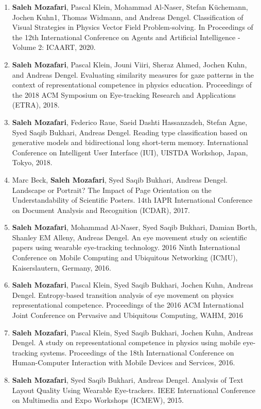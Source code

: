 \begin{enumerate}
	\item \textbf{Saleh Mozafari}, Pascal Klein, Mohammad Al-Naser, Stefan Küchemann, Jochen Kuhn1, Thomas Widmann, and Andreas Dengel. Classification of Visual Strategies in Physics Vector Field Problem-solving. In Proceedings of the 12th International Conference on Agents and Artificial Intelligence - Volume 2: ICAART, 2020.
	\item \textbf{Saleh Mozafari}, Pascal Klein, Jouni Viiri, Sheraz Ahmed, Jochen Kuhn, and Andreas Dengel.  Evaluating similarity measures for gaze patterns in the context of representational competence in physics education. Proceedings of the 2018 ACM Symposium on Eye-tracking Research and Applications (ETRA), 2018.
	\item \textbf{Saleh Mozafari}, Federico Raue, Saeid Dashti Hassanzadeh, Stefan Agne, Syed Saqib Bukhari, Andreas Dengel. Reading type classification based on generative models and bidirectional long short-term memory. International Conference on Intelligent User Interface (IUI), UISTDA Workshop, Japan, Tokyo, 2018.
	\item Marc Beck, \textbf{Saleh Mozafari}, Syed Saqib Bukhari, Andreas Dengel. Landscape or Portrait? The Impact of Page Orientation on the Understandability of Scientific Posters. 14th IAPR International Conference on Document Analysis and Recognition (ICDAR), 2017.
	\item \textbf{Saleh Mozafari}, Mohammad Al-Naser, Syed Saqib Bukhari, Damian Borth, Shanley EM Alleny, Andreas Dengel.  An eye movement study on scientific papers using wearable eye-tracking technology. 2016 Ninth International Conference on Mobile Computing and Ubiquitous Networking (ICMU), Kaiserslautern, Germany, 2016.
	\item \textbf{Saleh Mozafari}, Pascal Klein, Syed Saqib Bukhari, Jochen Kuhn, Andreas Dengel. Entropy-based transition analysis of eye movement on physics representational competence. Proceedings of the 2016 ACM International Joint Conference on Pervasive and Ubiquitous Computing, WAHM, 2016
	\item \textbf{Saleh Mozafari}, Pascal Klein, Syed Saqib Bukhari, Jochen Kuhn, Andreas Dengel. A study on representational competence in physics using mobile eye-tracking systems. Proceedings of the 18th International Conference on Human-Computer Interaction with Mobile Devices and Services, 2016.
	\item \textbf{Saleh Mozafari}, Syed Saqib Bukhari, Andreas Dengel. Analysis of Text Layout Quality Using Wearable Eye-trackers. IEEE  International Conference on Multimedia and Expo Workshops (ICMEW), 2015.

\end{enumerate}
